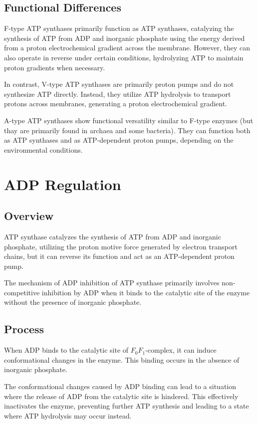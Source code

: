 \documentclass{article}
\begin{document}
\subsection{Functional Differences}

F-type ATP synthases primarily function as ATP synthases, catalyzing the synthesis of ATP from ADP and inorganic phosphate using the energy derived from a proton electrochemical gradient across the membrane. However, they can also operate in reverse under certain conditions, hydrolyzing ATP to maintain proton gradients when necessary.

In contrast, V-type ATP synthases are primarily proton pumps and do not synthesize ATP directly. Instead, they utilize ATP hydrolysis to transport protons across membranes, generating a proton electrochemical gradient.

A-type ATP synthases show functional versatility similar to F-type enzymes (but thay are primarily found in archaea and some bacteria). They can function both as ATP synthases and as ATP-dependent proton pumps, depending on the environmental conditions.

\section{ADP Regulation}

\subsection{Overview}

ATP synthase catalyzes the synthesis of ATP from ADP and inorganic phosphate, utilizing the proton motive force generated by electron transport chains, but it can reverse its function and act as an ATP-dependent proton pump.

The mechanism of ADP inhibition of ATP synthase primarily involves non-competitive inhibition by ADP when it binds to the catalytic site of the enzyme without the presence of inorganic phosphate.

\subsection{Process}

When ADP binds to the catalytic site of $F_0F_1$-complex, it can induce conformational changes in the enzyme. This binding occurs in the absence of inorganic phosphate.

The conformational changes caused by ADP binding can lead to a situation where the release of ADP from the catalytic site is hindered. This effectively inactivates the enzyme, preventing further ATP synthesis and leading to a state where ATP hydrolysis may occur instead.
\end{document}
